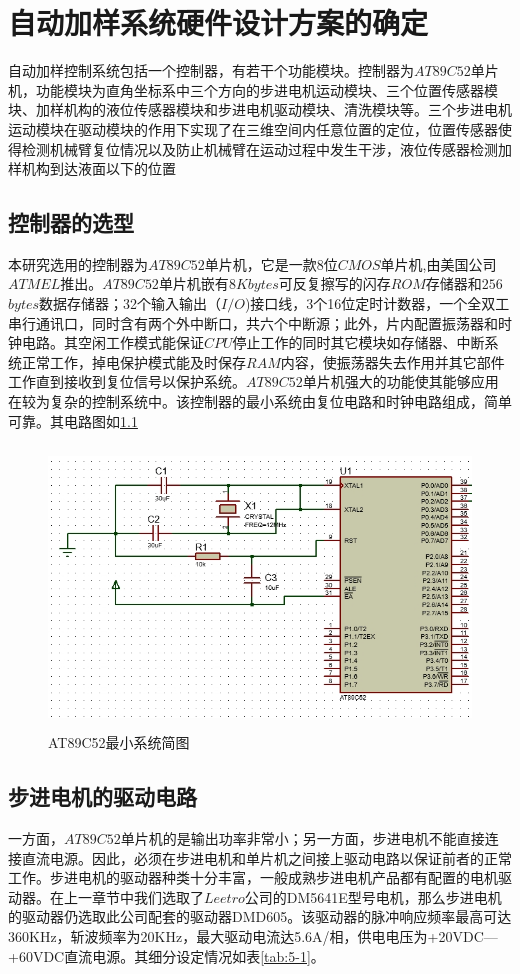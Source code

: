 \chapter{自动加样系统硬件设计方案的确定}
自动加样控制系统包括一个控制器，有若干个功能模块。控制器为$AT89C52$单片机，功能模块为直角坐标系中三个方向的步进电机运动模块、三个位置传感器模块、加样机构的液位传感器模块和步进电机驱动模块、清洗模块等。三个步进电机运动模块在驱动模块的作用下实现了在三维空间内任意位置的定位，位置传感器使得检测机械臂复位情况以及防止机械臂在运动过程中发生干涉，液位传感器检测加样机构到达液面以下的位置
\section{控制器的选型}
本研究选用的控制器为$AT89C52$单片机，它是一款8位$CMOS$单片机,由美国公司$ATMEL$推出。$AT89C52$单片机嵌有$8K bytes$可反复擦写的闪存$ROM$存储器和$256$ $bytes$数据存储器；32个输入输出（$I/O$)接口线，3个16位定时计数器，一个全双工串行通讯口，同时含有两个外中断口，共六个中断源；此外，片内配置振荡器和时钟电路。其空闲工作模式能保证$CPU$停止工作的同时其它模块如存储器、中断系统正常工作，掉电保护模式能及时保存$RAM$内容，使振荡器失去作用并其它部件工作直到接收到复位信号以保护系统\supercite{bib14}。$AT89C52$单片机强大的功能使其能够应用在较为复杂的控制系统中。该控制器的最小系统由复位电路和时钟电路组成，简单可靠。其电路图如\ref{fig:5-1}

\begin{figure}[htbp!]
	\centering
	\includegraphics[height=7.5cm]{chap/figure/5-1.jpg}
	\caption{AT89C52最小系统简图}
	\label{fig:5-1}
\end{figure}

\section{步进电机的驱动电路}
一方面，$AT89C52$单片机的是输出功率非常小；另一方面，步进电机不能直接连接直流电源。因此，必须在步进电机和单片机之间接上驱动电路以保证前者的正常工作。步进电机的驱动器种类十分丰富，一般成熟步进电机产品都有配置的电机驱动器。在上一章节中我们选取了$Leetro$公司的DM5641E型号电机，那么步进电机的驱动器仍选取此公司配套的驱动器DMD605。该驱动器的脉冲响应频率最高可达360KHz，斩波频率为20KHz，最大驱动电流达5.6A/相，供电电压为+20VDC—+60VDC直流电源。其细分设定情况如表\ref{tab:5-1}。

